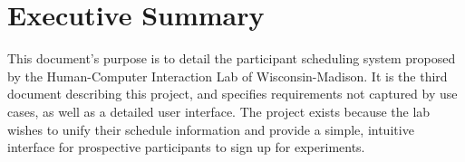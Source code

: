 \newcommand{\puttitle}{Milestone 4}


\section{Executive Summary}
This document's purpose is to detail the participant scheduling system proposed by the  Human-Computer Interaction Lab of Wisconsin-Madison. It is the third document describing this project, and specifies requirements not captured by use cases, as well as a detailed user interface.  The project exists because the lab wishes to unify their schedule information and provide a simple, intuitive interface for prospective participants to sign up for experiments.






